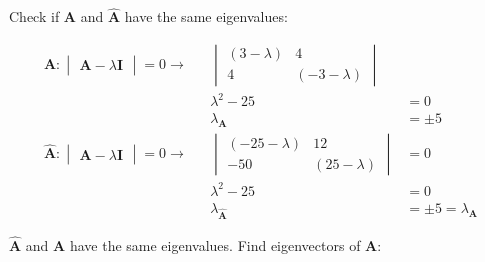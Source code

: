 \documentclass{article}
\begin{document}
Check if \textbf{A} and $\hat{\textbf{A}}$ have the same eigenvalues:

\begin{align}
    \label{eq:10}
    \textbf{A}: \begin{vmatrix}
    \textbf{A} - \lambda\textbf{I}
    \end{vmatrix}=0 \rightarrow && \begin{vmatrix}
    (3-\lambda) & 4 \\ 4 & (-3-\lambda)
    \end{vmatrix}
    \\
    \label{eq:11}
    && \lambda^2-25 &= 0
    \\
    \label{eq:12}
    && \lambda_\textbf{A} &= \pm 5
    \\
    \label{eq:13}
    \hat{\textbf{A}}: \begin{vmatrix}
    \textbf{A} - \lambda\textbf{I}
    \end{vmatrix}=0 \rightarrow && \begin{vmatrix}
    (-25-\lambda) & 12\\
    -50 & (25-\lambda)
    \end{vmatrix} &= 0
    \\
    \label{eq:14}
    && \lambda^2 -25 &= 0
    \\
    \label{eq:15}
    && \lambda_\hat{\textbf{A}} &= \pm 5 = \lambda_\textbf{A}
\end{align}

$\hat{\textbf{A}}$ and \textbf{A} have the same eigenvalues.  Find eigenvectors of \textbf{A}:
\end{document}
